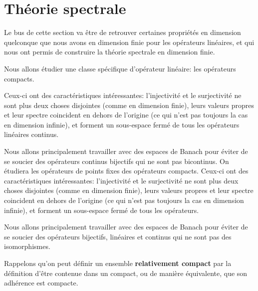 \section{Théorie spectrale}

Le bus de cette section va être de retrouver certaines propriétés en dimension
quelconque que nous avons en dimension finie pour les opérateurs linéaires, et
qui nous ont permis de construire la théorie spectrale en dimension finie.

Nous allons étudier une classe spécifique d'opérateur linéaire: les opérateurs
compacts.

Ceux-ci ont des caractéristiques intéressantes: l'injectivité et le surjectivité
ne sont plus deux choses disjointes (comme en dimension finie), leurs valeurs
propres et leur spectre coincident en dehors de l'origine (ce qui n'est pas
toujours la cas en dimension infinie), et forment un sous-espace fermé de tous
les opérateurs linéaires continus.

Nous allons principalement travailler avec des espaces de Banach pour éviter de
se soucier des opérateurs continus bijectifs qui ne sont pas bicontinus.
On étudiera les opérateurs de points fixes des opérateurs compacts. Ceux-ci ont
des caractéristiques intéressantes: l'injectivité et le surjectivité ne sont
plus deux choses disjointes (comme en dimension finie), leurs valeurs propres et
leur spectre coincident en dehors de l'origine (ce qui n'est pas toujours la cas
en dimension infinie), et forment un sous-espace fermé de tous les opérateurs.

Nous allons principalement travailler avec des espaces de Banach pour éviter de
se soucier des opérateurs bijectifs, linéaires et continus qui ne sont pas des
isomorphismes.




Rappelons qu'on peut définir un ensemble \textbf{relativement compact} par la
définition d'être contenue dans un compact, ou de manière équivalente, que son
adhérence est compacte.

